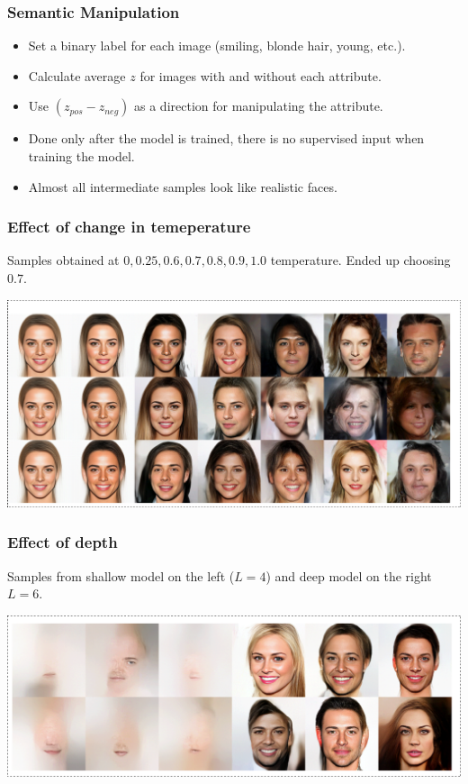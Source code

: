 \documentclass{beamer}
\begin{document}
\begin{frame}
  \frametitle{Semantic Manipulation}

  \begin{itemize}
    \item Set a binary label for each image (smiling, blonde hair, young, etc.).
    \item Calculate average $z$ for images with and without each attribute.
    \item Use $(z_{pos} - z_{neg})$ as a direction for manipulating the attribute.
    \item Done only after the model is trained, there is no supervised input when
      training the model.

    \item Almost all intermediate samples look like realistic faces.
  \end{itemize}
\end{frame}

\begin{frame}
  \frametitle{Effect of change in temeperature}

  Samples obtained at $0, 0.25, 0.6, 0.7, 0.8, 0.9, 1.0$ temperature. Ended up choosing $0.7$.

  \includegraphics[width=1.0\textwidth]{glow-temperature-increase.png}
\end{frame}

\begin{frame}
  \frametitle{Effect of depth}

  Samples from shallow model on the left ($L = 4$) and deep model on the right $L = 6$.

  \includegraphics[width=1.0\textwidth]{glow-depth.png}
\end{frame}
\end{document}
